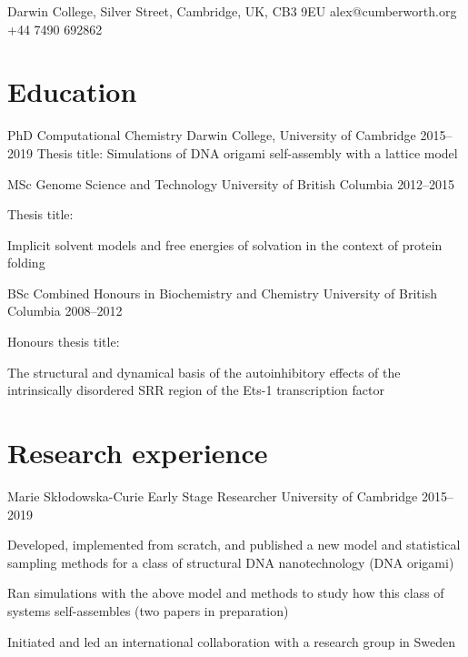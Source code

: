\documentclass[10pt]{article}
\begin{document}
\contact
    {Darwin College, Silver Street, Cambridge, UK, CB3 9EU}
    {alex@cumberworth.org}
    {+44 7490 692862}

\section{Education}
\vspace{-0.2cm}

\degree
    {PhD}
    {Computational Chemistry}
    {Darwin College, University of Cambridge}
    {2015--2019}
    {Thesis title: Simulations of DNA origami self-assembly with a lattice model}
    \vspace{0.3cm}

\degree
    {MSc}
    {Genome Science and Technology}
    {University of British Columbia}
    {2012--2015}
    {
        Thesis title:
        \begin{minipage}[t]{0.8\textwidth}
            Implicit solvent models and free energies of solvation in the context of protein folding
        \end{minipage}%
    }
    \vspace{0.3cm}

\degree
    {BSc}
    {Combined Honours in Biochemistry and Chemistry}
    {University of British Columbia}
    {2008--2012}
    {
        Honours thesis title: 
        \begin{minipage}[t]{0.8\textwidth}
            The structural and dynamical basis of the autoinhibitory effects of the intrinsically disordered SRR region of the Ets-1 transcription factor
    \end{minipage}%
    }

\section{Research experience}
\vspace{-0.2cm}

\research
    {Marie Skłodowska-Curie Early Stage Researcher}
    {University of Cambridge}
    {2015--2019}
    {
    \item Developed, implemented from scratch, and published a new model and statistical sampling methods for a class of structural DNA nanotechnology (DNA origami)
    \item Ran simulations with the above model and methods to study how this class of systems self-assembles (two papers in preparation)
    \item Initiated and led an international collaboration with a research group in Sweden
    }
    \vspace{0.3cm}
\end{document}
